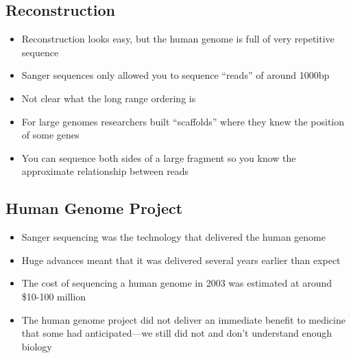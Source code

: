 
\begin{slide}
\section{Reconstruction}

\begin{PauseHighLight}
  \begin{itemize}
  \item Reconstruction looks easy, but the human genome is full of very
    repetitive sequence\pause
  \item Sanger sequences only allowed you to sequence ``reads'' of
    around 1000bp\pause
  \item Not clear what the long range ordering is\pause
  \item For large genomes researchers built ``scaffolds'' where they
    knew the position of some genes\pause
  \item You can sequence both sides of a large fragment so you know the
    approximate relationship between reads\pause
  \end{itemize}
\end{PauseHighLight}

\end{slide}


\begin{slide}
\section{Human Genome Project}

\begin{PauseHighLight}
  \begin{itemize}
  \item Sanger sequencing was the technology that delivered the human
    genome\pause
  \item Huge advances meant that it was delivered several years earlier
    than expect\pause
  \item The cost of sequencing a human genome in 2003 was estimated at
    around \$10-100 million\pause
  \item The human genome project did not deliver an immediate benefit to
    medicine that some had anticipated---we still did not and don't
    understand enough biology\pause
  \end{itemize}
\end{PauseHighLight}

\end{slide}




